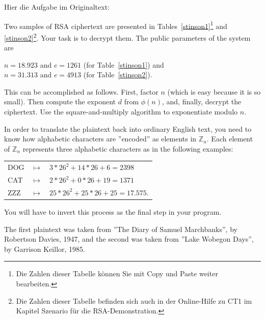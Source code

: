\begin{refsegment}
\noindent Hier die Aufgabe im Originaltext:

Two samples of RSA ciphertext are presented in Tables~\ref{stinson1}\footnote{%
Die Zahlen dieser Tabelle können Sie mit Copy und Paste weiter bearbeiten.
}
and \ref{stinson2}\footnote{%
  Die Zahlen dieser Tabelle befinden sich auch in der Online-Hilfe zu
  CT1 im Kapitel \glqq Szenario für die RSA-Demonstration\grqq.
}.
Your task is to decrypt them. The public parameters of the system are

\noindent $n = 18.923$ and $e = 1261$ (for Table~\ref{stinson1}) and\\
\noindent $n = 31.313$ and $e = 4913$ (for Table~\ref{stinson2}).

This can be accomplished as follows. First, factor $n$ (which is easy
because it is so small). Then compute the exponent $d$ from $\phi(n)$, and,
finally, decrypt the ciphertext. Use the square-and-multiply
 algorithm to exponentiate modulo $n$.

In order to translate the plaintext back into ordinary English text, you
need to know how alphabetic characters are ''encoded'' as elements in
$\mathbb{Z}_n$. Each element of $\mathbb{Z}_n$ represents three alphabetic
characters as in the following examples:

{\tt \begin{tabular}{lll}
DOG & $\mapsto$ & $3 * 26^2 + 14 * 26 + 6= 2398$\\
CAT & $\mapsto$ & $2 * 26^2 + 0 * 26 + 19 = 1371$\\
ZZZ & $\mapsto$ & $25 * 26^2 + 25 * 26 + 25 = 17.575$.
\end{tabular} }

You will have to invert this process as the final step in your program.

The first plaintext was taken from ''The Diary of Samuel Marchbanks'', by
Robertson Davies, 1947, and the second was taken from ''Lake Wobegon Days'',
by Garrison Keillor, 1985.


\end{refsegment}
